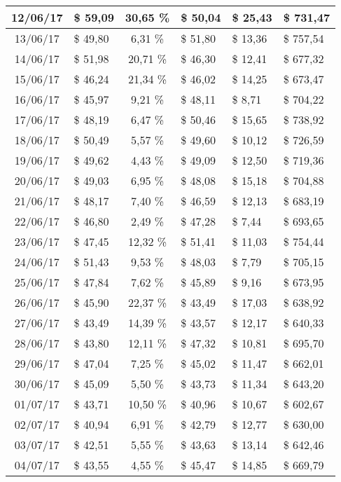 \begin{center}
\begin{small}
\begin{longtable}{|c|l|c|l|l|l|}
12/06/17 & \$ 59,09 & 30,65 \% & \$ 50,04 & \$ 25,43 & \$ 731,47 \\ \hline
13/06/17 & \$ 49,80 & 6,31 \% & \$ 51,80 & \$ 13,36 & \$ 757,54 \\ \hline
14/06/17 & \$ 51,98 & 20,71 \% & \$ 46,30 & \$ 12,41 & \$ 677,32 \\ \hline
15/06/17 & \$ 46,24 & 21,34 \% & \$ 46,02 & \$ 14,25 & \$ 673,47 \\ \hline
16/06/17 & \$ 45,97 & 9,21 \% & \$ 48,11 & \$ 8,71 & \$ 704,22 \\ \hline
17/06/17 & \$ 48,19 & 6,47 \% & \$ 50,46 & \$ 15,65 & \$ 738,92 \\ \hline
18/06/17 & \$ 50,49 & 5,57 \% & \$ 49,60 & \$ 10,12 & \$ 726,59 \\ \hline
19/06/17 & \$ 49,62 & 4,43 \% & \$ 49,09 & \$ 12,50 & \$ 719,36 \\ \hline
20/06/17 & \$ 49,03 & 6,95 \% & \$ 48,08 & \$ 15,18 & \$ 704,88 \\ \hline
21/06/17 & \$ 48,17 & 7,40 \% & \$ 46,59 & \$ 12,13 & \$ 683,19 \\ \hline
22/06/17 & \$ 46,80 & 2,49 \% & \$ 47,28 & \$ 7,44 & \$ 693,65 \\ \hline
23/06/17 & \$ 47,45 & 12,32 \% & \$ 51,41 & \$ 11,03 & \$ 754,44 \\ \hline
24/06/17 & \$ 51,43 & 9,53 \% & \$ 48,03 & \$ 7,79 & \$ 705,15 \\ \hline
25/06/17 & \$ 47,84 & 7,62 \% & \$ 45,89 & \$ 9,16 & \$ 673,95 \\ \hline
26/06/17 & \$ 45,90 & 22,37 \% & \$ 43,49 & \$ 17,03 & \$ 638,92 \\ \hline
27/06/17 & \$ 43,49 & 14,39 \% & \$ 43,57 & \$ 12,17 & \$ 640,33 \\ \hline
28/06/17 & \$ 43,80 & 12,11 \% & \$ 47,32 & \$ 10,81 & \$ 695,70 \\ \hline
29/06/17 & \$ 47,04 & 7,25 \% & \$ 45,02 & \$ 11,47 & \$ 662,01 \\ \hline
30/06/17 & \$ 45,09 & 5,50 \% & \$ 43,73 & \$ 11,34 & \$ 643,20 \\ \hline
01/07/17 & \$ 43,71 & 10,50 \% & \$ 40,96 & \$ 10,67 & \$ 602,67 \\ \hline
02/07/17 & \$ 40,94 & 6,91 \% & \$ 42,79 & \$ 12,77 & \$ 630,00 \\ \hline
03/07/17 & \$ 42,51 & 5,55 \% & \$ 43,63 & \$ 13,14 & \$ 642,46 \\ \hline
04/07/17 & \$ 43,55 & 4,55 \% & \$ 45,47 & \$ 14,85 & \$ 669,79 \\ \hline

\end{longtable}
\end{small}
\end{center}
